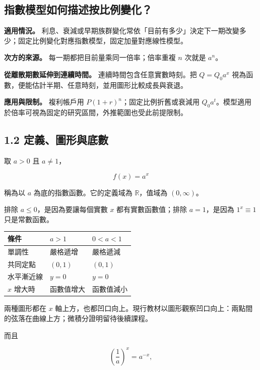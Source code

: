 \documentclass[11pt,a4paper]{article}
\newcounter{none}
\begin{document}
\subsection{指數模型如何描述按比例變化？}\label{ux6307ux6578ux6a21ux578bux5982ux4f55ux63cfux8ff0ux6309ux6bd4ux4f8bux8b8aux5316}

\textbf{適用情況。} 利息、衰減或早期族群變化常依「目前有多少」決定下一期改變多少；固定比例變化對應指數模型，固定加量對應線性模型。

\textbf{次方的來源。} 每一期都把目前量乘同一倍率；倍率重複 \(n\) 次就是 \(a^n\)。

\textbf{從離散期數延伸到連續時間。} 連續時間包含任意實數時刻。把 \(Q=Q_0a^x\) 視為函數，便能估計半期、任意時刻，並用圖形比較成長與衰退。

\textbf{應用與限制。} 複利帳戶用 \(P(1+r)^n\)；固定比例折舊或衰減用 \(Q_0a^t\)。模型適用於倍率可視為固定的研究區間，外推範圍也受此前提限制。

\subsection{1.2 定義、圖形與底數}\label{ux5b9aux7fa9ux5716ux5f62ux8207ux5e95ux6578}

取 \(a>0\) 且 \(a\ne1\)，

\[
\boxed{f(x)=a^x}
\]

稱為以 \(a\) 為底的指數函數。它的定義域為 \(\mathbb R\)，值域為 \((0,\infty)\)。

排除 \(a\le0\)，是因為要讓每個實數 \(x\) 都有實數函數值；排除 \(a=1\)，是因為 \(1^x\equiv1\) 只是常數函數。

{\def\LTcaptype{none} %
\begin{longtable}[]{@{}lll@{}}
\toprule\noalign{}
條件 & \(a>1\) & \(0<a<1\) \\
\midrule\noalign{}
\endhead
\bottomrule\noalign{}
\endlastfoot
單調性 & 嚴格遞增 & 嚴格遞減 \\
共同定點 & \((0,1)\) & \((0,1)\) \\
水平漸近線 & \(y=0\) & \(y=0\) \\
\(x\) 增大時 & 函數值增大 & 函數值減小 \\
\end{longtable}
}

兩種圖形都在 \(x\) 軸上方，也都凹口向上。現行教材以圖形觀察凹口向上：兩點間的弦落在曲線上方；微積分證明留待後續課程。

而且

\[
\left(\frac1a\right)^x=a^{-x},
\]
\end{document}
